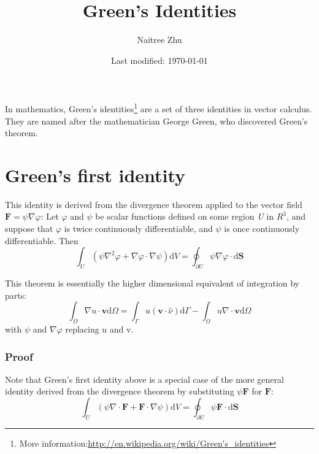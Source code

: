 \documentclass[a4paper]{article}
\title{Green's Identities}
\author{Naitree Zhu}
\date{Last modified: \today}
\begin{document}
\maketitle
In mathematics, Green's identities\footnote{More information:\url{http://en.wikipedia.org/wiki/Green's_identities}} are a set of three identities in vector calculus. They are named after the mathematician George Green, who discovered Green's theorem.
\part{Green's first identity}
This identity is derived from the divergence theorem applied to the vector field $\boldsymbol{F}=\psi\nabla\varphi$: Let $\varphi$ and $\psi$ be scalar functions defined on some region \textit{U} in $R^{3}$, and suppose that $\varphi$ is twice continuously differentiable, and $\psi$ is once continuously differentiable. Then
\begin{equation}
\int_U\left(\psi\nabla^{2}\varphi+\nabla\varphi\cdot\nabla\psi\right)\mathrm{d}V=\oint_{\partial U} \psi\nabla\varphi\cdot\mathrm{d}\boldsymbol{S}
\end{equation}

This theorem is essentially the higher dimensional equivalent of integration by parts:
\begin{equation}
\int_\Omega\nabla u\cdot\boldsymbol{v}\mathrm{d}\Omega=\int_\Gamma u\left(\boldsymbol{v}\cdot\hat{\nu}\right)\mathrm{d}\Gamma-\int_\Omega u\nabla\cdot\boldsymbol{v}\mathrm{d}\Omega
\end{equation}
with $\psi$ and $\nabla\varphi$ replacing u and v.
\section*{Proof}
Note that Green's first identity above is a special case of the more general identity derived from the divergence theorem by substituting $\psi\bm{F}$ for $\bm{F}$:
\begin{equation}
\int_U\left(\psi\nabla\cdot\bm{F}+\bm{F}\cdot\nabla\psi\right)\mathrm{d}V=\oint_{\partial U}\psi\bm{F}\cdot\mathrm{d}\bm{S}
\end{equation} 
\end{document}
